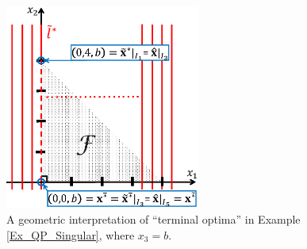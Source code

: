 \documentclass{imaman}
\numberwithin{equation}{section}
\begin{document}
\begin{figure}[htbp]
    \begin{center}
    \includegraphics[width=6.4cm]{Fig_Ex_QP_Singular.eps}
    \caption{A geometric interpretation of ``terminal optima'' in Example {\rm\ref{Ex_QP_Singular}}, where $x_3=b$.}
    \label{Fig_Ex_QP_Singular}
    \end{center}
\end{figure}
\end{document}
